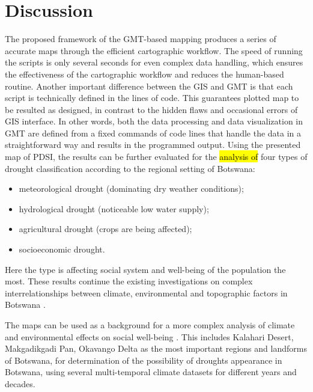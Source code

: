 \documentclass[ijgi,article,submit,pdftex,moreauthors]{Definitions/mdpi}
\begin{document}
\section{Discussion}

The proposed framework of the GMT-based mapping produces a series of accurate maps through the efficient cartographic workflow. The speed of running the scripts is only several seconds for even complex data handling, which ensures the effectiveness of the cartographic workflow and reduces the human-based routine. Another important difference between the GIS and GMT is that each script is technically defined in the lines of code. This guarantees plotted map to be resulted as designed, in contrast to the hidden flaws and occasional errors of GIS interface. In other words, both the data processing and data visualization in GMT are defined from a fixed commands of code lines that handle the data in a straightforward way and results in the programmed output. Using the presented map of PDSI, the results can be further evaluated for the \hl{analysis of} four types of drought classification according to the regional setting of Botswana: 

    \begin{itemize}
        \item[$-$] meteorological drought (dominating dry weather conditions); 
        \item[$-$] hydrological drought (noticeable low water supply); 
        \item[$-$] agricultural drought (crops are being affected); 
        \item[$-$] socioeconomic drought. 
   \end{itemize} 
      
        Here the  type is affecting social system and well-being of the population the most. These results continue the existing investigations on complex interrelationships between climate, environmental and topographic factors in Botswana \cite{McGill,Maoyi,Ramberg2006b,Maoyi}. 

The maps can be used as a background for a more complex analysis of climate and environmental effects on social well-being \cite{Asefa,Vanderpost1995,Rahm,Mogomotsi}. This includes Kalahari Desert, Makgadikgadi Pan, Okavango Delta as the most important regions and landforms of Botswana, for determination of the possibility of droughts appearance in Botswana, using several multi-temporal climate datasets for different years and decades. 
\end{document}
